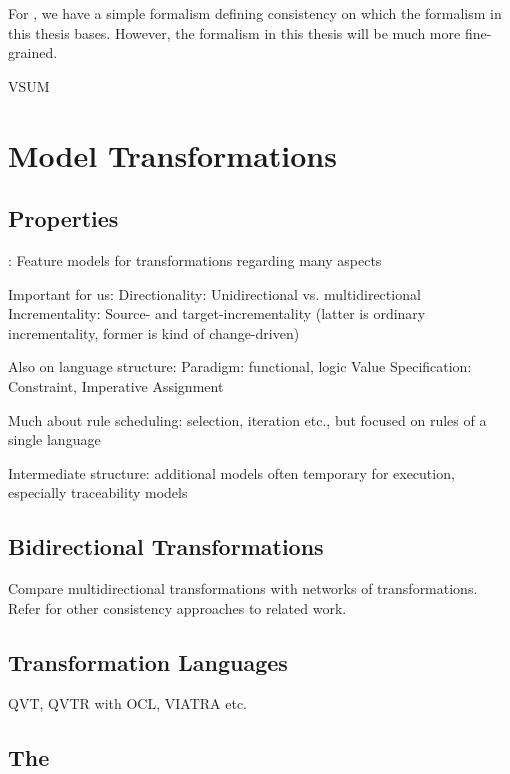 For \vitruv, we have a simple formalism defining consistency on which the formalism in this thesis bases.
However, the formalism in this thesis will be much more fine-grained.

\gls{VSUM} \vsum


\section{Model Transformations}

\subsection{Properties}
\textcite{czarnecki2006a}: Feature models for transformations regarding many aspects

Important for us:
Directionality: Unidirectional vs. multidirectional
Incrementality: Source- and target-incrementality (latter is ordinary incrementality, former is kind of change-driven)

Also on language structure:
Paradigm: functional, logic
Value Specification: Constraint, Imperative Assignment

Much about rule scheduling: selection, iteration etc., but focused on rules of a single language

Intermediate structure: additional models often temporary for execution, especially traceability models


\subsection{Bidirectional Transformations}


Compare multidirectional transformations with networks of transformations.
Refer for other consistency approaches to related work.

\subsection{Transformation Languages}

\gls{QVT}, \gls{QVTR} with \gls{OCL}, \gls{VIATRA} etc.



\subsection{The \reactionslanguage}
\label{chap:foundations:transformations:reactions}

